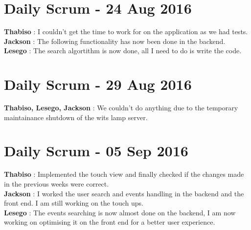 \documentclass[10pt,a4paper]{article}
\begin{document}
\section{Daily Scrum - 24 Aug 2016}
\textbf{Thabiso} : I couldn't get the time to work for on the application as we had tests.\\

\textbf{Jackson} : The following functionality has now been done in the backend.\\

\textbf{Lesego} : The search algortithm is now done, all I need to do is write the code.\\
\section{Daily Scrum - 29 Aug 2016}
\textbf{Thabiso, Lesego, Jackson} : We couldn't do anything due to the temporary maintainance shutdown of the wits lamp server.\\

\section{Daily Scrum - 05 Sep 2016}
\textbf{Thabiso} : Implemented the touch view and finally checked if the changes made in the previous weeks were correct.\\

\textbf{Jackson} : I worked the user search and events handling in the backend and the front end. I am  still working on the touch ups.\\

\textbf{Lesego} : The events searching is now almost done on the backend, I am now working on optimising it on the front end for a better 
user experience.\\
\end{document}
